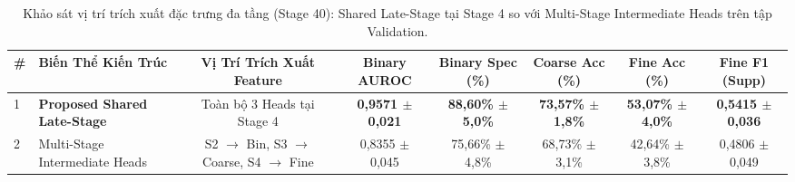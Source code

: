 \begin{table}[t]
\centering
\small
\caption{Khảo sát vị trí trích xuất đặc trưng đa tầng (Stage 40): Shared Late-Stage tại Stage 4 so với Multi-Stage Intermediate Heads trên tập Validation.}
\label{tab:ablation_head_placement}
\begin{adjustbox}{width=\textwidth}
\begin{tabular}{llcccccc}
\toprule
\textbf{\#} & \textbf{Biến Thể Kiến Trúc} & \textbf{Vị Trí Trích Xuất Feature} & \textbf{Binary AUROC} & \textbf{Binary Spec (\%)} & \textbf{Coarse Acc (\%)} & \textbf{Fine Acc (\%)} & \textbf{Fine F1 (Supp)} \\
\midrule
1 & \textbf{Proposed Shared Late-Stage} & Toàn bộ 3 Heads tại Stage 4 & \textbf{0,9571 $\pm$ 0,021} & \textbf{88,60\% $\pm$ 5,0\%} & \textbf{73,57\% $\pm$ 1,8\%} & \textbf{53,07\% $\pm$ 4,0\%} & \textbf{0,5415 $\pm$ 0,036} \\
2 & Multi-Stage Intermediate Heads & S2 $\rightarrow$ Bin, S3 $\rightarrow$ Coarse, S4 $\rightarrow$ Fine & 0,8355 $\pm$ 0,045 & 75,66\% $\pm$ 4,8\% & 68,73\% $\pm$ 3,1\% & 42,64\% $\pm$ 3,8\% & 0,4806 $\pm$ 0,049 \\
\bottomrule
\end{tabular}
\end{adjustbox}
\end{table}
